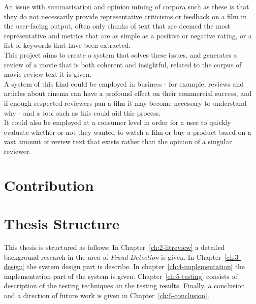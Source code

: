 An issue with summarisation and opinion mining of corpora such as these is that they do not necessarily provide representative criticisms or feedback on a film in the user-facing output, often only chunks of text that are deemed the most representative and metrics that are as simple as a positive or negative rating, or a list of keywords that have been extracted.\\

This project aims to create a system that solves these issues, and generates a review of a movie that is both coherent and insightful, related to the corpus of movie review text it is given.\\

A system of this kind could be employed in business - for example, reviews and articles about cinema can have a profound effect on their commercial success, and if enough respected reviewers pan a film it may become necessary to understand why - and a tool such as this could aid this process.\\

It could also be employed at a consumer level in order for a user to quickly evaluate whether or not they wanted to watch a film or buy a product based on a vast amount of review text that exists rather than the opinion of a singular reviewer.

\section{Contribution}


\section{Thesis Structure}
This thesis is structured as follows: In Chapter~\ref{ch:2-litreview} a detailed background research in the  area of \emph{Fraud Detection} is given. In Chapter~\ref{ch:3-design} the system design part is describe. 
 In chapter~\ref{ch:4-implementation} the implementation part of the system is given. Chapter~\ref{ch:5-testing} 
 consists of description of the testing techniques an the testing results. Finally, a conclusion and a direction of future work is given in  Chapter~\ref{ch:6-conclusion}. 
